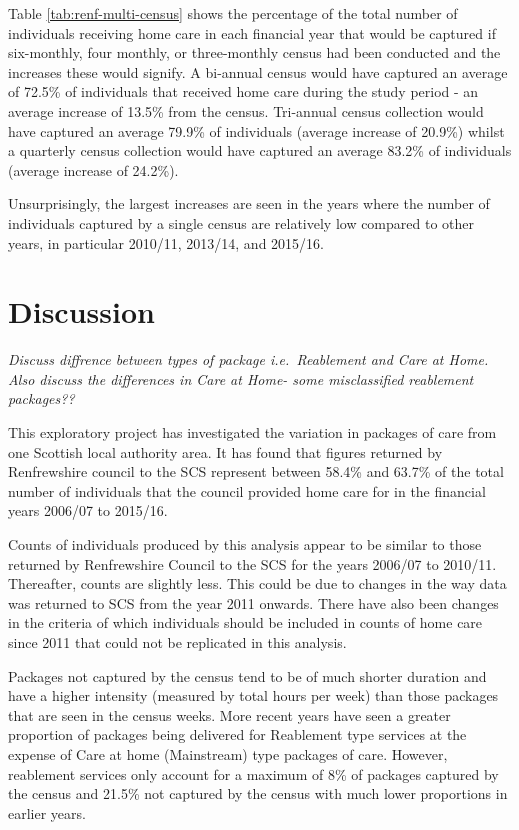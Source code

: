 \documentclass[]{article}
\begin{document}
Table \ref{tab:renf-multi-census} shows the percentage of the total
number of individuals receiving home care in each financial year that
would be captured if six-monthly, four monthly, or three-monthly census
had been conducted and the increases these would signify. A bi-annual
census would have captured an average of 72.5\% of individuals that
received home care during the study period - an average increase of
13.5\% from the census. Tri-annual census collection would have captured
an average 79.9\% of individuals (average increase of 20.9\%) whilst a
quarterly census collection would have captured an average 83.2\% of
individuals (average increase of 24.2\%).

Unsurprisingly, the largest increases are seen in the years where the
number of individuals captured by a single census are relatively low
compared to other years, in particular 2010/11, 2013/14, and 2015/16.

\section{Discussion}\label{sec:renf-discuss}

\emph{Discuss diffrence between types of package i.e.~Reablement and
Care at Home. Also discuss the differences in Care at Home- some
misclassified reablement packages??}

This exploratory project has investigated the variation in packages of
care from one Scottish local authority area. It has found that figures
returned by Renfrewshire council to the SCS represent between 58.4\% and
63.7\% of the total number of individuals that the council provided home
care for in the financial years 2006/07 to 2015/16.

Counts of individuals produced by this analysis appear to be similar to
those returned by Renfrewshire Council to the SCS for the years 2006/07
to 2010/11. Thereafter, counts are slightly less. This could be due to
changes in the way data was returned to SCS from the year 2011 onwards.
There have also been changes in the criteria of which individuals should
be included in counts of home care since 2011 that could not be
replicated in this analysis.

Packages not captured by the census tend to be of much shorter duration
and have a higher intensity (measured by total hours per week) than
those packages that are seen in the census weeks. More recent years have
seen a greater proportion of packages being delivered for Reablement
type services at the expense of Care at home (Mainstream) type packages
of care. However, reablement services only account for a maximum of 8\%
of packages captured by the census and 21.5\% not captured by the census
with much lower proportions in earlier years.
\end{document}
